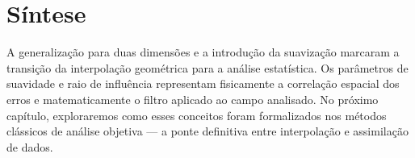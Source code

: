 \section{Síntese}
A generalização para duas dimensões e a introdução da suavização marcaram a transição da interpolação geométrica para a análise estatística.  
Os parâmetros de suavidade e raio de influência representam fisicamente a correlação espacial dos erros e matematicamente o filtro aplicado ao campo analisado.  
No próximo capítulo, exploraremos como esses conceitos foram formalizados nos métodos clássicos de análise objetiva — a ponte definitiva entre interpolação e assimilação de dados.

